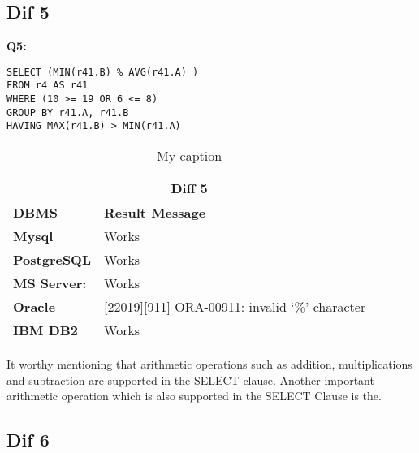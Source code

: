 \subsection{Dif 5}
  
\begin{mdframed}[backgroundcolor=gray!20] 
\textbf{Q5:}
\begin{lstlisting}
SELECT (MIN(r41.B) % AVG(r41.A) ) 
FROM r4 AS r41
WHERE (10 >= 19 OR 6 <= 8)   
GROUP BY r41.A, r41.B
HAVING MAX(r41.B) > MIN(r41.A) 
\end{lstlisting}
\end{mdframed}

\begin{table}[h]
\centering
\caption{My caption}
\label{my-label}
\begin{tabular}{|p{2cm}|p{12cm}|}
\hline
\multicolumn{2}{|c|}{\textbf{Diff 5}}                                                               \\ \hline
\textbf{DBMS}                              & \textbf{Result Message}                                \\ \hline
{\color[HTML]{333333} \textbf{Mysql}}      & {\color[HTML]{333333} Works}                           \\ \hline
{\color[HTML]{333333} \textbf{PostgreSQL}} & {\color[HTML]{333333} Works}                           \\ \hline
{\color[HTML]{333333} \textbf{MS Server:}} & {\color[HTML]{333333} Works}                           \\ \hline
\textbf{Oracle}                            & {[}22019{]}{[}911{]} ORA-00911: invalid ‘\%’ character \\ \hline
\textbf{IBM DB2}                           & Works                                                  \\ \hline
\end{tabular}
\end{table}

It worthy mentioning that arithmetic operations such as addition, multiplications and  subtraction are supported in the SELECT clause. Another important arithmetic operation which is also  supported in the SELECT Clause is the.

\subsection{Dif 6}
  
